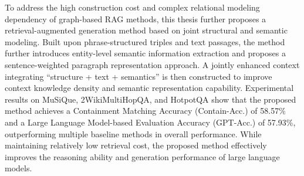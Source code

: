 \begin{eabstract}
  To address the high construction cost and complex relational modeling dependency of graph-based RAG methods, this thesis further proposes a retrieval-augmented generation method based on joint structural and semantic modeling.
  Built upon phrase-structured triples and text passages, the method further introduces entity-level semantic information extraction and proposes a sentence-weighted paragraph representation approach.
  A jointly enhanced context integrating “structure + text + semantics” is then constructed to improve context knowledge density and semantic representation capability.
  Experimental results on MuSiQue, 2WikiMultiHopQA, and HotpotQA show that the proposed method achieves a Containment Matching Accuracy (Contain-Acc.) of 58.57\% and a Large Language Model-based Evaluation Accuracy (GPT-Acc.) of 57.93\%, outperforming multiple baseline methods in overall performance.
  While maintaining relatively low retrieval cost, the proposed method effectively improves the reasoning ability and generation performance of large language models.
  
\end{eabstract}
